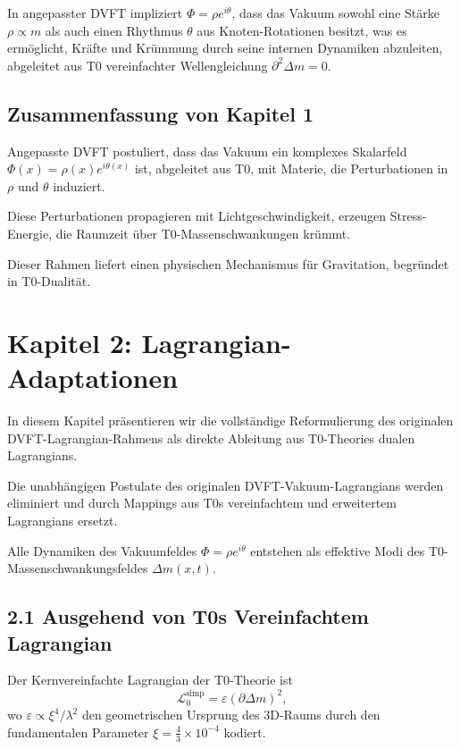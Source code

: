 	In angepasster DVFT impliziert $\Phi = \rho e^{i\theta}$, dass das Vakuum sowohl eine Stärke $\rho \propto m$ als auch einen Rhythmus $\theta$ aus Knoten-Rotationen besitzt, was es ermöglicht, Kräfte und Krümmung durch seine internen Dynamiken abzuleiten, abgeleitet aus T0 vereinfachter Wellengleichung $\partial^2 \Delta m = 0$.
	
	\subsection{Zusammenfassung von Kapitel 1}
	
	Angepasste DVFT postuliert, dass das Vakuum ein komplexes Skalarfeld $\Phi(x) = \rho(x) e^{i\theta(x)}$ ist, abgeleitet aus T0, mit Materie, die Perturbationen in $\rho$ und $\theta$ induziert.
	
	Diese Perturbationen propagieren mit Lichtgeschwindigkeit, erzeugen Stress-Energie, die Raumzeit über T0-Massenschwankungen krümmt.
	
	Dieser Rahmen liefert einen physischen Mechanismus für Gravitation, begründet in T0-Dualität.
	
	\section{Kapitel 2: Lagrangian-Adaptationen}
	
	In diesem Kapitel präsentieren wir die vollständige Reformulierung des originalen DVFT-Lagrangian-Rahmens als direkte Ableitung aus T0-Theories dualen Lagrangians.
	
	Die unabhängigen Postulate des originalen DVFT-Vakuum-Lagrangians werden eliminiert und durch Mappings aus T0s vereinfachtem und erweitertem Lagrangians ersetzt.
	
	Alle Dynamiken des Vakuumfeldes $\Phi = \rho e^{i\theta}$ entstehen als effektive Modi des T0-Massenschwankungsfeldes $\Delta m(x,t)$.
	
	\subsection{2.1 Ausgehend von T0s Vereinfachtem Lagrangian}
	
	Der Kernvereinfachte Lagrangian der T0-Theorie ist
	\[
	\mathcal{L}_0^{\text{simp}} = \varepsilon (\partial \Delta m)^2,
	\]
	wo $\varepsilon \propto \xi^4 / \lambda^2$ den geometrischen Ursprung des 3D-Raums durch den fundamentalen Parameter $\xi = \frac{4}{3} \times 10^{-4}$ kodiert.
	
